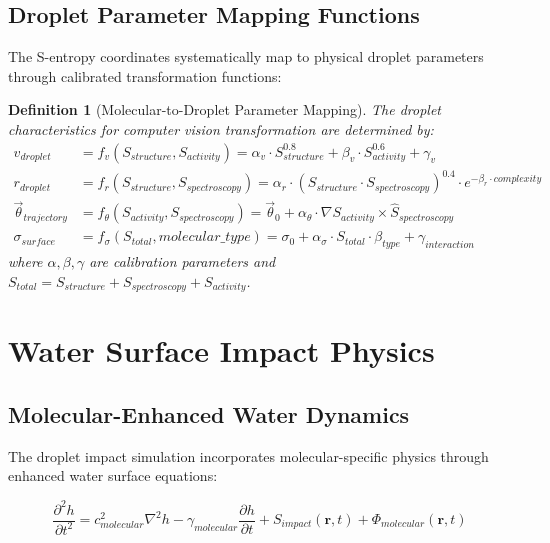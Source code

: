 \documentclass[12pt,a4paper]{article}
\newtheorem{definition}{Definition}
\begin{document}
\subsection{Droplet Parameter Mapping Functions}

The S-entropy coordinates systematically map to physical droplet parameters through calibrated transformation functions:

\begin{definition}[Molecular-to-Droplet Parameter Mapping]
The droplet characteristics for computer vision transformation are determined by:
\begin{align}
v_{droplet} &= f_v(S_{structure}, S_{activity}) = \alpha_v \cdot S_{structure}^{0.8} + \beta_v \cdot S_{activity}^{0.6} + \gamma_v \\
r_{droplet} &= f_r(S_{structure}, S_{spectroscopy}) = \alpha_r \cdot (S_{structure} \cdot S_{spectroscopy})^{0.4} \cdot e^{-\beta_r \cdot complexity} \\
\vec{\theta}_{trajectory} &= f_\theta(S_{activity}, S_{spectroscopy}) = \vec{\theta}_0 + \alpha_\theta \cdot \nabla S_{activity} \times \hat{S}_{spectroscopy} \\
\sigma_{surface} &= f_\sigma(S_{total}, molecular\_type) = \sigma_0 + \alpha_\sigma \cdot S_{total} \cdot \beta_{type} + \gamma_{interaction}
\end{align}
where $\alpha, \beta, \gamma$ are calibration parameters and $S_{total} = S_{structure} + S_{spectroscopy} + S_{activity}$.
\end{definition}

\section{Water Surface Impact Physics}

\subsection{Molecular-Enhanced Water Dynamics}

The droplet impact simulation incorporates molecular-specific physics through enhanced water surface equations:

\begin{equation}
\frac{\partial^2 h}{\partial t^2} = c_{molecular}^2 \nabla^2 h - \gamma_{molecular} \frac{\partial h}{\partial t} + S_{impact}(\mathbf{r}, t) + \Phi_{molecular}(\mathbf{r}, t)
\end{equation}
\end{document}
